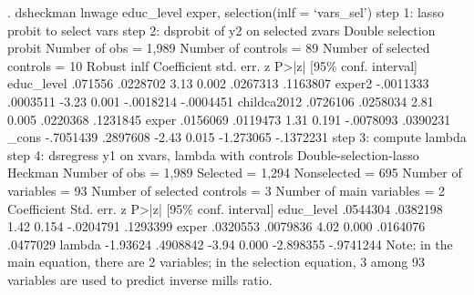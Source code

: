 . dsheckman lnwage educ_level exper, selection(inlf = `vars_sel')         
{\smallskip}
step 1: lasso probit to select vars
step 2: dsprobit of y2 on selected zvars
{\smallskip}
Double selection probit               Number of obs               =      1,989
                                      Number of controls          =         89
                                      Number of selected controls =         10
             {\VBAR}               Robust
        inlf {\VBAR} Coefficient  std. err.      z    P>|z|     [95\% conf. interval]
  educ_level {\VBAR}    .071556   .0228702     3.13   0.002     .0267313    .1163807
      exper2 {\VBAR}  -.0011333   .0003511    -3.23   0.001    -.0018214   -.0004451
childca{\tytilde}2012 {\VBAR}   .0726106   .0258034     2.81   0.005     .0220368    .1231845
       exper {\VBAR}   .0156069   .0119473     1.31   0.191    -.0078093    .0390231
       _cons {\VBAR}  -.7051439   .2897608    -2.43   0.015    -1.273065   -.1372231
step 3: compute lambda
step 4: dsregress y1 on xvars, lambda with controls
{\smallskip}
Double-selection-lasso Heckman        Number of obs               =      1,989
                                             Selected             =      1,294
                                             Nonselected          =        695
                                      Number of variables         =         93
                                      Number of selected controls =          3
                                      Number of main variables    =          2
{\smallskip}
             {\VBAR} Coefficient  Std. err.      z    P>|z|     [95\% conf. interval]
  educ_level {\VBAR}   .0544304   .0382198     1.42   0.154    -.0204791    .1293399
       exper {\VBAR}   .0320553   .0079836     4.02   0.000     .0164076    .0477029
      lambda {\VBAR}   -1.93624   .4908842    -3.94   0.000    -2.898355   -.9741244
Note: in the main equation, there are 2 variables; in the selection equation,
      3 among 93 variables are used to predict inverse mills ratio.
